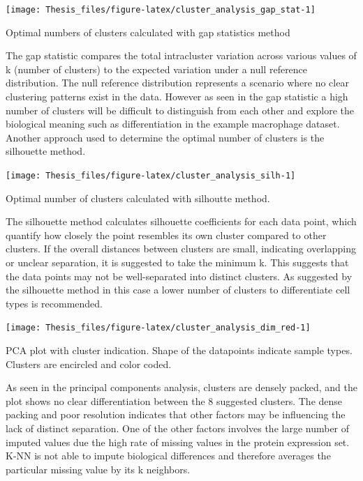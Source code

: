 \documentclass[
  11pt,
]{article}
\let\origfigure\figure
\begin{document}
\bgroup  \origfigure[H] 

{\centering \texttt{[image: Thesis\_files/figure-latex/cluster\_analysis\_gap\_stat-1]} 

}

\caption{Optimal numbers of clusters calculated with gap statistics method}\label{fig:cluster_analysis_gap_stat}
 \endfigure\egroup

The gap statistic compares the total intracluster variation across
various values of k (number of clusters) to the expected variation under
a null reference distribution. The null reference distribution
represents a scenario where no clear clustering patterns exist in the
data. However as seen in the gap statistic a high number of clusters
will be difficult to distinguish from each other and explore the
biological meaning such as differentiation in the example macrophage
dataset. Another approach used to determine the optimal number of
clusters is the silhouette method.

\bgroup  \origfigure[H] 

{\centering \texttt{[image: Thesis\_files/figure-latex/cluster\_analysis\_silh-1]} 

}

\caption{Optimal number of clusters calculated with silhoutte method.}\label{fig:cluster_analysis_silh}
 \endfigure\egroup

The silhouette method calculates silhouette coefficients for each data
point, which quantify how closely the point resembles its own cluster
compared to other clusters. If the overall distances between clusters
are small, indicating overlapping or unclear separation, it is suggested
to take the minimum k. This suggests that the data points may not be
well-separated into distinct clusters. As suggested by the silhouette
method in this case a lower number of clusters to differentiate cell
types is recommended.

\bgroup  \origfigure[H] 

{\centering \texttt{[image: Thesis\_files/figure-latex/cluster\_analysis\_dim\_red-1]} 

}

\caption{PCA plot with cluster indication. Shape of the datapoints indicate sample types. Clusters are encircled and color coded.}\label{fig:cluster_analysis_dim_red}
 \endfigure\egroup

As seen in the principal components analysis, clusters are densely
packed, and the plot shows no clear differentiation between the 8
suggested clusters. The dense packing and poor resolution indicates that
other factors may be influencing the lack of distinct separation. One of
the other factors involves the large number of imputed values due the
high rate of missing values in the protein expression set. K-NN is not
able to impute biological differences and therefore averages the
particular missing value by its k neighbors.
\end{document}
